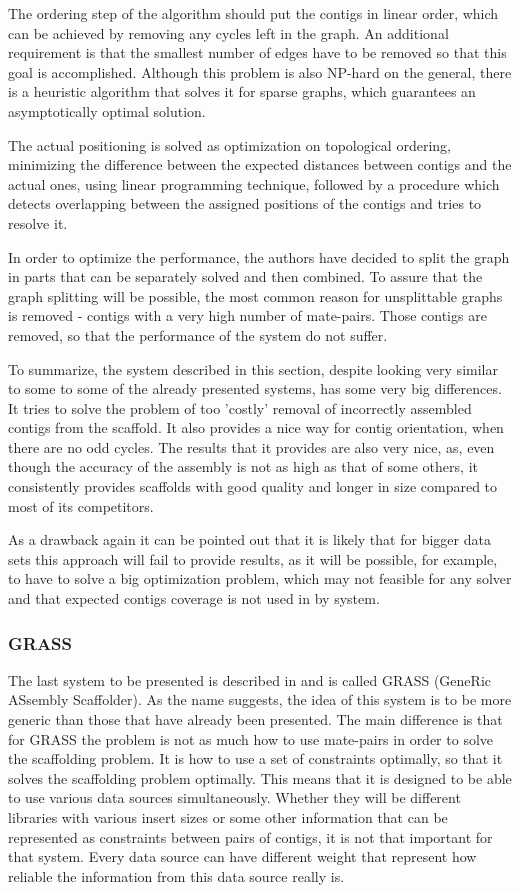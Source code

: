 \documentclass[11pt]{article}
\begin{document}
The ordering step of the algorithm should put the contigs in linear order, which
can be achieved by removing any cycles left in the graph. An additional
requirement is that the smallest number of edges have to be removed so that this
goal is accomplished. Although this problem is also NP-hard on the general,
there is a heuristic algorithm that solves it for sparse graphs, which
guarantees an asymptotically optimal solution.

The actual positioning is solved as optimization on topological ordering,
minimizing the difference between the expected distances between contigs and the
actual ones, using linear programming technique, followed by a procedure which
detects overlapping between the assigned positions of the contigs and tries to
resolve it.

In order to optimize the performance, the authors have decided to split the
graph in parts that can be separately solved and then combined. To assure that
the graph splitting will be possible, the most common reason for unsplittable
graphs is removed - contigs with a very high number of mate-pairs. Those contigs
are removed, so that the performance of the system do not suffer.

To summarize, the system described in this section, despite looking very similar
to some to some of the already presented systems, has some very big differences.
It tries to solve the problem of too 'costly' removal of incorrectly assembled
contigs from the scaffold. It also provides a nice way for contig orientation,
when there are no odd cycles. The results that it provides are also very nice,
as, even though the accuracy of the assembly is not as high as that of some
others, it consistently provides scaffolds with good quality and longer in size
compared to most of its competitors.

As a drawback again it can be pointed out that it is likely that for bigger data
sets this approach will fail to provide results, as it will be possible, for
example, to have to solve a big optimization problem, which may not feasible for
any solver and that expected contigs coverage is not used in by system.

\subsubsection{GRASS} %
\label{ssub:GRASS}
The last system to be presented is described in \cite{grass} and is called
GRASS (GeneRic ASsembly Scaffolder). As the name suggests, the idea of this
system is to be more generic than those that have already been presented. The
main difference is that for GRASS the problem is not as much how to use
mate-pairs in order to solve the scaffolding problem. It is how to use a set of
constraints optimally, so that it solves the scaffolding problem optimally. This
means that it is designed to be able to use various data sources simultaneously.
Whether they will be different libraries with various insert sizes or some other
information that can be represented as constraints between pairs of contigs, it
is not that important for that system. Every data source can have different
weight that represent how reliable the information from this data source really
is.
\end{document}
